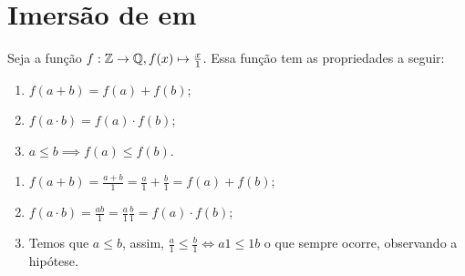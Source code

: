 \documentclass[../main.tex]{subfiles}
\begin{document}
\section{Imersão de \Z em \Q}
\begin{teo}\label{rac-teo-imersao}
    Seja a função $f: \mathbb{Z} \rightarrow \mathbb{Q}, f(x) \mapsto \frac{x}{1}$. Essa função tem as propriedades a seguir:
    \begin{enumerate}[label=(\roman*)]
        \item $f(a + b) = f(a) + f(b)$;
        \item $f(a \cdot b) = f(a) \cdot f(b)$;
        \item $a \leq b \implies f(a) \leq f(b)$.
    \end{enumerate}
\end{teo}
\begin{dem}
    \begin{enumerate}[label=(\roman*)]
        \item $f(a + b) = \frac{a+b}{1} = \frac{a}{1} + \frac{b}{1} = f(a) + f(b)$;
        \item $f(a \cdot b) = \frac{ab}{1} = \frac{a}{1} \frac{b}{1} = f(a) \cdot f(b)$;
        \item Temos que $a \leq b$, assim, $\frac{a}{1} \leq \frac{b}{1} \iff a1 \leq 1b$ o que sempre ocorre, observando a hipótese.
    \end{enumerate}
\end{dem}
\end{document}
